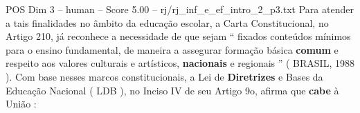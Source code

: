 \begin{textsample}{POS Dim 3 – human – Score 5.00 – rj/rj\_inf\_e\_ef\_intro\_2\_p3.txt}  \label{ex:f3_pos_017}
Para atender a tais finalidades no âmbito da educação escolar, a Carta Constitucional, no Artigo 210, já reconhece a necessidade de que sejam “ fixados conteúdos mínimos para o ensino fundamental, de maneira a assegurar formação básica \textbf{comum} e respeito aos valores culturais e artísticos, \textbf{nacionais} e regionais ” ( BRASIL, 1988 ).
Com base nesses marcos constitucionais, a Lei de \textbf{Diretrizes} e Bases da Educação Nacional ( LDB ), no Inciso IV de seu Artigo 9o, afirma que \textbf{cabe} à União :

\end{textsample}
